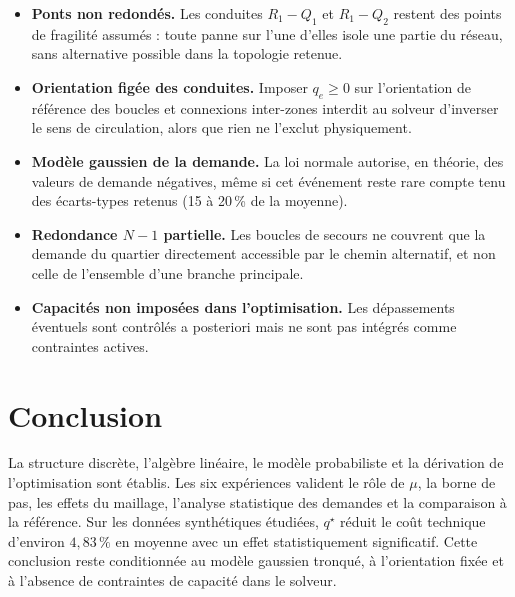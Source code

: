 \documentclass[11pt]{ama-article}
\begin{document}
\begin{itemize}[leftmargin=*]
    \item \textbf{Ponts non redondés.} Les conduites $R_1\!-\!Q_1$ et $R_1\!-\!Q_2$ restent des
    points de fragilité assumés : toute panne sur l'une d'elles isole une partie du réseau,
    sans alternative possible dans la topologie retenue.
    \item \textbf{Orientation figée des conduites.} Imposer $q_e\ge 0$ sur l'orientation de
    référence des boucles et connexions inter-zones interdit au solveur d'inverser le sens de
    circulation, alors que rien ne l'exclut physiquement.
    \item \textbf{Modèle gaussien de la demande.} La loi normale autorise, en théorie, des
    valeurs de demande négatives, même si cet événement reste rare compte tenu des écarts-types
    retenus (15 à 20\,\% de la moyenne).
    \item \textbf{Redondance $N-1$ partielle.} Les boucles de secours ne couvrent que la
    demande du quartier directement accessible par le chemin alternatif, et non celle de
    l'ensemble d'une branche principale.
    \item \textbf{Capacités non imposées dans l'optimisation.} Les dépassements éventuels sont
    contrôlés a posteriori mais ne sont pas intégrés comme contraintes actives.
\end{itemize}

\section{Conclusion}

La structure discrète, l'algèbre linéaire, le modèle probabiliste et la dérivation de
l'optimisation sont établis. Les six expériences valident le rôle de $\mu$, la borne de pas,
les effets du maillage, l'analyse statistique des demandes et la comparaison à la référence.
Sur les données synthétiques étudiées, $q^\star$ réduit le coût technique d'environ $4{,}83\,\%$
en moyenne avec un effet statistiquement significatif. Cette conclusion reste conditionnée au
modèle gaussien tronqué, à l'orientation fixée et à l'absence de contraintes de capacité dans
le solveur.
\end{document}
